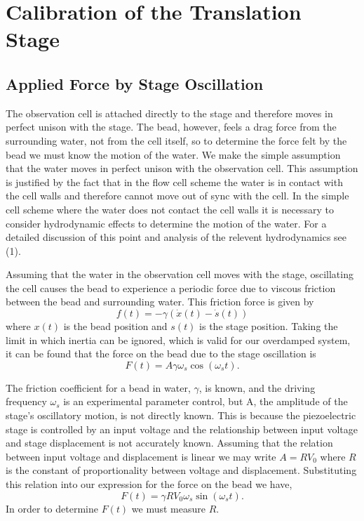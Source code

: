 \documentclass{report}
\begin{document}

\chapter{Calibration of the Translation Stage}

\section{Applied Force by Stage Oscillation}

The observation cell is attached directly to the stage and therefore moves in perfect unison with the stage. The bead, however, feels a drag force from the surrounding water, not from the cell itself, so to determine the force felt by the bead we must know the motion of the water. We make the simple assumption that the water moves in perfect unison with the observation cell. This assumption is justified by the fact that in the flow cell scheme the water is in contact with the cell walls and therefore cannot move out of sync with the cell. In the simple cell scheme where the water does not contact the cell walls it is necessary to consider hydrodynamic effects to determine the motion of the water. For a detailed discussion of this point and analysis of the relevent hydrodynamics see (1).

Assuming that the water in the observation cell moves with the stage, oscillating the cell causes the bead to experience a periodic force due to viscous friction between the bead and surrounding water. This friction force is given by
\begin{displaymath}
f(t) = -\gamma (\dot{x}(t) - \dot{s}(t))
\end{displaymath}
where $x(t)$ is the bead position and $s(t)$ is the stage position. Taking the limit in which inertia can be ignored, which is valid for our overdamped system, it can be found that the force on the bead due to the stage oscillation is
\begin{displaymath}
F(t) = A \gamma \omega_s \cos(\omega_s t).
\end{displaymath}

The friction coefficient for a bead in water, $\gamma$, is known, and the driving frequency $\omega_s$ is an experimental parameter control, but A, the amplitude of the stage's oscillatory motion, is not directly known.  This is because the piezoelectric stage is controlled by an input voltage and the relationship between input voltage and stage displacement is not accurately known. Assuming that the relation between input voltage and displacement is linear we may write $A = R V_0$ where $R$ is the constant of proportionality between voltage and displacement.  Substituting this relation into our expression for the force on the bead we have,
\begin{displaymath}
F(t) = \gamma R V_0 \omega_s \sin(\omega_s t).
\end{displaymath}
In order to determine $F(t)$ we must measure $R$.
\end{document}
